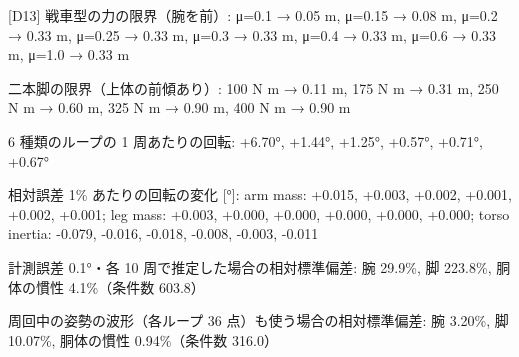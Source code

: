 {[D13] 戦車型の力の限界（腕を前）: μ=0.1 → 0.05 m, μ=0.15 → 0.08 m, μ=0.2 → 0.33 m, μ=0.25 → 0.33 m, μ=0.3 → 0.33 m, μ=0.4 → 0.33 m, μ=0.6 → 0.33 m, μ=1.0 → 0.33 m\par
[D13] 二本脚の限界（上体の前傾あり）: 100 N m → 0.11 m, 175 N m → 0.31 m, 250 N m → 0.60 m, 325 N m → 0.90 m, 400 N m → 0.90 m\par
[D14] 6 種類のループの 1 周あたりの回転: +6.70°, +1.44°, +1.25°, +0.57°, +0.71°, +0.67°\par
[D14] 相対誤差 1\% あたりの回転の変化 [°]: arm mass: +0.015, +0.003, +0.002, +0.001, +0.002, +0.001; leg mass: +0.003, +0.000, +0.000, +0.000, +0.000, +0.000; torso inertia: -0.079, -0.016, -0.018, -0.008, -0.003, -0.011\par
[D14] 計測誤差 0.1°・各 10 周で推定した場合の相対標準偏差: 腕 29.9\%, 脚 223.8\%, 胴体の慣性 4.1\%（条件数 603.8）\par
[D14] 周回中の姿勢の波形（各ループ 36 点）も使う場合の相対標準偏差: 腕 3.20\%, 脚 10.07\%, 胴体の慣性 0.94\%（条件数 316.0）\par
}
